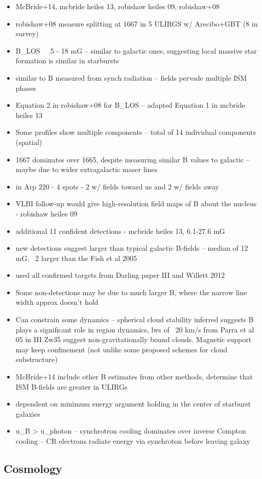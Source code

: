 \begin{itemize}
\item McBride+14, mcbride heiles 13, robishaw heiles 09, robishaw+08
\item robishaw+08 measure splitting at 1667 in 5 ULIRGS w/ Arecibo+GBT (8 in survey)
\item B_LOS ~ .5 - 18 mG -- similar to galactic ones, suggesting local massive star formation is similar in starbursts
\item similar to B measured from synch radiation -- fields pervade multiple ISM phases
\item Equation 2 in robishaw+08 for B_LOS -- adapted Equation 1 in mcbride heiles 13
\item Some profiles show multiple components -- total of 14 individual components (spatial)
\item 1667 dominates over 1665, despite measuring similar B values to galactic -- maybe due to wider extragalactic maser lines
\item in Arp 220 - 4 spots - 2 w/ fields toward us and 2 w/ fields away
\item VLBI follow-up would give high-resolution field maps of B about the nucleus - robishaw heiles 09
\item additional 11 confident detections - mcbride heiles 13, 6.1-27.6 mG
\item new detections suggest larger than typical galactic B-fields -- median of 12 mG, ~2 larger than the Fish et al 2005
\item used all confirmed targets from Darling paper III and Willett 2012
\item Some non-detections may be due to much larger B, where the narrow line width approx doesn't hold
\item Can constrain some dynamics -- spherical cloud stability inferred suggests B plays a significant role in region dynamics, lws of ~20 km/s from Parra et al 05 in III Zw35 suggest non-gravitationally bound clouds. Magnetic support may keep confinement (not unlike some proposed schemes for cloud substructure)
\item McBride+14 include other B estimates from other methods, determine that ISM B-fields are greater in ULIRGs
\item dependent on minimum energy argument holding in the center of starburst galaxies
\item u_B > u_photon -- synchrotron cooling dominates over inverse Compton cooling -- CR electrons radiate energy via synchroton before leaving galaxy
\end{itemize}

\subsection{Cosmology}